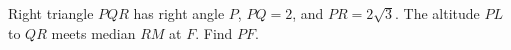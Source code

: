Right triangle $PQR$ has right angle $P$, $PQ=2$, and $PR=2\sqrt3$. The altitude $PL$ to $QR$ meets median $RM$ at $F$. Find $PF$.
